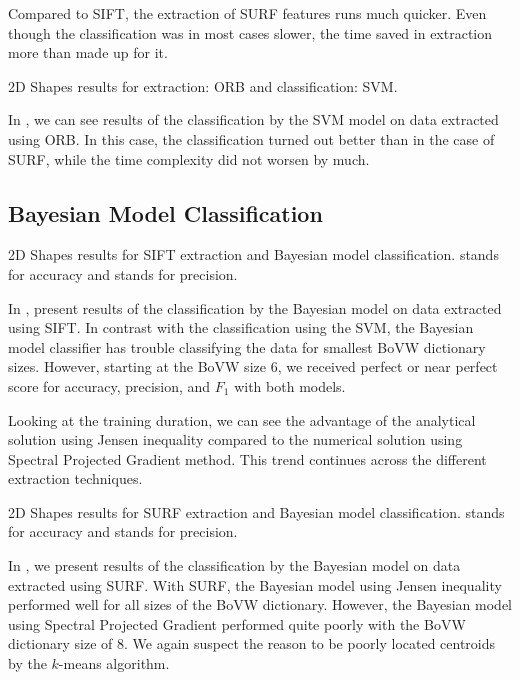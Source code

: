 Compared to SIFT, the extraction of SURF features runs much quicker. Even though the classification was in most cases slower, the time saved in extraction more than made up for it.

\begin{table}[ht!]
    \centering
    
    \caption[2D Shapes results for extraction: ORB and classification: SVM]{2D Shapes results for extraction: ORB and classification: SVM.}
    \label{tab:2d_ORB_SVM}
\end{table}
In , we can see results of the classification by the SVM model on data extracted using ORB. In this case, the classification turned out better than in the case of SURF, while the time complexity did not worsen by much.

\subsection{Bayesian Model Classification}
\begin{table}[ht!]
    \centering
    
    \caption[2D Shapes results for SIFT extraction and Bayesian model classification]{2D Shapes results for SIFT extraction and Bayesian model classification.  stands for accuracy and  stands for precision.}
    \label{tab:2d_SIFT_bayes}
\end{table}
In , present results of the classification by the Bayesian model on data extracted using SIFT. In contrast with the classification using the SVM, the Bayesian model classifier has trouble classifying the data for smallest BoVW dictionary sizes. However, starting at the BoVW size $6$, we received perfect or near perfect score for accuracy, precision, and $F_1$ with both models.

Looking at the training duration, we can see the advantage of the analytical solution using Jensen inequality compared to the numerical solution using Spectral Projected Gradient method. This trend continues across the different extraction techniques.

\begin{table}[ht!]
    \centering
    
    \caption[2D Shapes results for SURF extraction and Bayesian model classification]{2D Shapes results for SURF extraction and Bayesian model classification.  stands for accuracy and  stands for precision.}
    \label{tab:2d_SURF_bayes}
\end{table}
In , we present results of the classification by the Bayesian model on data extracted using SURF. With SURF, the Bayesian model using Jensen inequality performed well for all sizes of the BoVW dictionary. However, the Bayesian model using Spectral Projected Gradient performed quite poorly with the BoVW dictionary size of $8$. We again suspect the reason to be poorly located centroids by the $k$-means algorithm.


